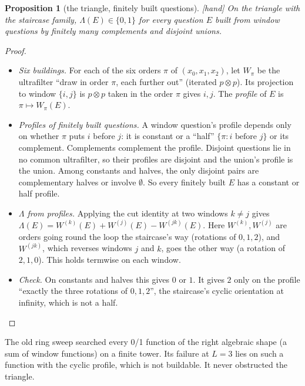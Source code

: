 \documentclass[11pt]{article}
\theoremstyle{plain}
\newtheorem{proposition}[theorem]{Proposition}
\theoremstyle{definition}
\newcommand{\st}[1]{\textsf{\small[#1]}}
\begin{document}
\begin{proposition}[the triangle, finitely built questions]\label{prop:sixorders}\st{hand}
On the triangle with the staircase family, $\Lambda(E)\in\{0,1\}$ for every
question $E$ built from window questions by finitely many complements and
disjoint unions.
\end{proposition}
\begin{proof}
\begin{itemize}[nosep]
  \item \emph{Six buildings.} For each of the six orders $\pi$ of
    $(x_0,x_1,x_2)$, let $W_\pi$ be the ultrafilter ``draw in order $\pi$, each
    further out'' (iterated $p\otimes p$). Its projection to window $\{i,j\}$
    is $p\otimes p$ taken in the order $\pi$ gives $i,j$. The \emph{profile} of
    $E$ is $\pi\mapsto W_\pi(E)$.
  \item \emph{Profiles of finitely built questions.} A window question's profile
    depends only on whether $\pi$ puts $i$ before $j$: it is constant or a
    ``half'' $\{\pi: i\text{ before }j\}$ or its complement. Complements
    complement the profile. Disjoint questions lie in no common ultrafilter, so
    their profiles are disjoint and the union's profile is the union. Among
    constants and halves, the only disjoint pairs are complementary halves or
    involve $\emptyset$. So every finitely built $E$ has a constant or half
    profile.
  \item \emph{$\Lambda$ from profiles.} Applying the cut identity at two windows
    $k\neq j$ gives
    $\Lambda(E)=W^{(k)}(E)+W^{(j)}(E)-W^{(jk)}(E)$. Here $W^{(k)},W^{(j)}$ are
    orders going round the loop the staircase's way (rotations of $0,1,2$), and
    $W^{(jk)}$, which reverses windows $j$ and $k$, goes the other way (a
    rotation of $2,1,0$). This holds termwise on each window.
  \item \emph{Check.} On constants and halves this gives $0$ or $1$. It gives
    $2$ only on the profile ``exactly the three rotations of $0,1,2$'', the
    staircase's cyclic orientation at infinity, which is not a half.
\end{itemize}
\end{proof}
\noindent The old ring sweep searched every 0/1 function of the right algebraic
shape (a sum of window functions) on a finite tower. Its failure at $L=3$ lies
on such a function with the cyclic profile, which is not buildable. It never
obstructed the triangle.
\end{document}
